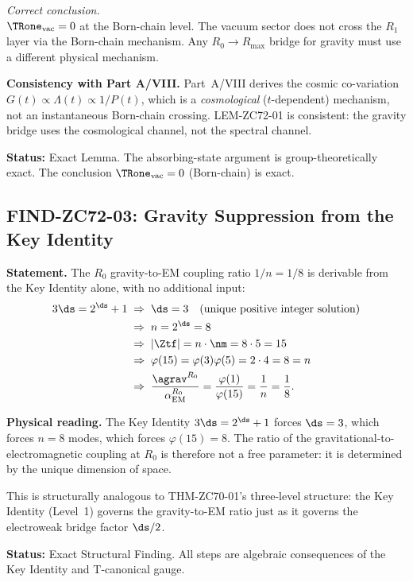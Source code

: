 \documentclass[12pt, a4paper]{article}
\renewcommand{\aEM}{\alpha_{\rm EM}}
\begin{document}
\begin{formalbox}[title={LEM-ZC72-01: No Born-Chain $R_1$ Crossing Cost
  for the Vacuum Sector ($R_0$, Exact)}]
\textit{Correct conclusion.}\\
$\TRone_{\rm vac} = 0$ at the Born-chain level.
The vacuum sector does not cross the $R_1$ layer via
the Born-chain mechanism.
Any $R_0 \to R_{\max}$ bridge for gravity must use a
different physical mechanism.

\textbf{Consistency with Part A/VIII.}
Part~A/VIII derives the cosmic co-variation
$G(t) \propto \Lambda(t) \propto 1/P(t)$, which is a
\emph{cosmological} ($t$-dependent) mechanism, not an
instantaneous Born-chain crossing.
LEM-ZC72-01 is consistent: the gravity bridge uses the
cosmological channel, not the spectral channel.

\textbf{Status:} Exact Lemma.
The absorbing-state argument is group-theoretically exact.
The conclusion $\TRone_{\rm vac} = 0$ (Born-chain) is exact.
\end{formalbox}

\subsection{FIND-ZC72-03: Gravity Suppression from the Key Identity}
\label{sec:find03}

\begin{derivedbox}[title={FIND-ZC72-03: $\agrav^{R_0}/\aEM^{R_0} = 1/8$
  Is a Theorem of $3\ds = 2^{\ds}+1$ ($R_0$, Exact)}]

\textbf{Statement.}
The $R_0$ gravity-to-EM coupling ratio $1/n = 1/8$ is derivable
from the Key Identity alone, with no additional input:
\begin{align*}
  3\ds = 2^{\ds}+1
  &\;\Rightarrow\; \ds = 3 \quad(\text{unique positive integer solution})\\
  &\;\Rightarrow\; n = 2^{\ds} = 8\\
  &\;\Rightarrow\; |\Ztf| = n\cdot\nm = 8\cdot5 = 15\\
  &\;\Rightarrow\; \varphi(15) = \varphi(3)\varphi(5) = 2\cdot4 = 8 = n\\
  &\;\Rightarrow\; \frac{\agrav^{R_0}}{\aEM^{R_0}}
    = \frac{\varphi(1)}{\varphi(15)}
    = \frac{1}{n}
    = \frac{1}{8}.
\end{align*}

\textbf{Physical reading.}
The Key Identity $3\ds = 2^{\ds}+1$ forces $\ds = 3$,
which forces $n = 8$ modes, which forces $\varphi(15) = 8$.
The ratio of the gravitational-to-electromagnetic coupling
at $R_0$ is therefore not a free parameter: it is determined
by the unique dimension of space.

This is structurally analogous to THM-ZC70-01's three-level
structure: the Key Identity (Level~1) governs the gravity-to-EM
ratio just as it governs the electroweak bridge factor $\ds/2$.

\textbf{Status:} Exact Structural Finding.
All steps are algebraic consequences of the Key Identity
and T-canonical gauge.
\end{derivedbox}
\end{document}
